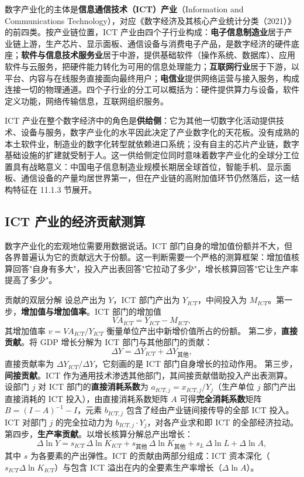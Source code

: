 数字产业化的主体是\textbf{信息通信技术（ICT）产业}（Information and Communications Technology），对应《数字经济及其核心产业统计分类（2021）》的前四类。按产业链位置，ICT 产业由四个子行业构成：\textbf{电子信息制造业}居于产业链上游，生产芯片、显示面板、通信设备与消费电子产品，是数字经济的硬件底座；\textbf{软件与信息技术服务业}居于中游，提供基础软件（操作系统、数据库）、应用软件与云服务，把硬件能力转化为可用的信息处理能力；\textbf{互联网行业}居于下游，以平台、内容与在线服务直接面向最终用户；\textbf{电信业}提供网络运营与接入服务，构成连接一切的物理通道。四个子行业的分工可以概括为：硬件提供算力与设备，软件定义功能，网络传输信息，互联网组织服务。

ICT 产业在整个数字经济中的角色是\textbf{供给侧}：它为其他一切数字化活动提供技术、设备与服务，数字产业化的水平因此决定了产业数字化的天花板。没有成熟的本土软件业，制造业的数字化转型就依赖进口系统；没有自主的芯片产业链，数字基础设施的扩建就受制于人。这一供给侧定位同时意味着数字产业化的全球分工位置具有战略意义：中国电子信息制造业规模长期居全球首位，智能手机、显示面板、通信设备的产量均居世界第一，但在产业链的高附加值环节仍然落后，这一结构特征在 11.1.3 节展开。

\subsection{ICT 产业的经济贡献测算}

数字产业化的宏观地位需要用数据说话。ICT 部门自身的增加值份额并不大，但各界普遍认为它的贡献远大于份额。这一判断需要一个严格的测算框架：增加值核算回答"自身有多大"，投入产出表回答"它拉动了多少"，增长核算回答"它让生产率提高了多少"。

\begin{derivation}{贡献的双层分解}{}
设总产出为 $Y$，ICT 部门产出为 $Y_{ICT}$，中间投入为 $M_{ICT}$。第一步，\textbf{增加值与增加值率}。ICT 部门的增加值
\[
VA_{ICT} = Y_{ICT} - M_{ICT},
\]
其增加值率 $v = VA_{ICT}/Y_{ICT}$ 衡量单位产出中新增价值所占的份额。
第二步，\textbf{直接贡献}。将 GDP 增长分解为 ICT 部门与其他部门的贡献：
\[
\Delta Y = \Delta Y_{ICT} + \Delta Y_{\text{其他}},
\]
直接贡献率为 $\Delta Y_{ICT}/\Delta Y$，它刻画的是 ICT 部门自身增长的拉动作用。
第三步，\textbf{间接贡献}。ICT 作为通用技术渗透其他部门，其间接贡献借助投入产出表测算。设部门 $j$ 对 ICT 部门的\textbf{直接消耗系数}为 $a_{ICT,j} = x_{ICT,j}/Y_j$（生产单位 $j$ 部门产出直接消耗的 ICT 投入），由直接消耗系数矩阵 $A$ 可得\textbf{完全消耗系数}矩阵 $B = (I - A)^{-1} - I$，元素 $b_{ICT,j}$ 包含了经由产业链间接传导的全部 ICT 投入。ICT 对部门 $j$ 的完全拉动力为 $b_{ICT,j} \cdot Y_j$，对各产业求和即 ICT 的全部经济拉动。
第四步，\textbf{生产率贡献}。以增长核算分解总产出增长：
\[
\Delta \ln Y = s_{ICT}\,\Delta \ln K_{ICT} + s_{\text{其他}}\,\Delta \ln K_{\text{其他}} + s_L\,\Delta \ln L + \Delta \ln A,
\]
其中 $s$ 为各要素的产出弹性。ICT 的贡献由两部分组成：ICT 资本深化（$s_{ICT}\Delta\ln K_{ICT}$）与包含 ICT 溢出在内的全要素生产率增长（$\Delta\ln A$）。
\end{derivation}

